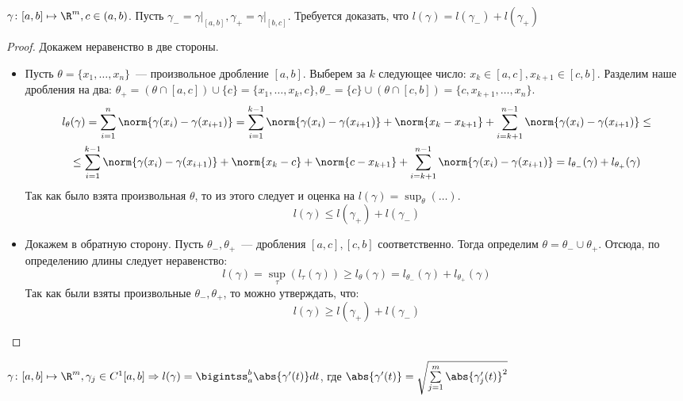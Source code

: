 \begin{theorem}
    $\gamma\colon [a,b]\mapsto\R^m, c\in(a,b)$.
    Пусть $\gamma_{-}=\gamma\big|_{[a,b]}, \gamma_{+} = \gamma\big|_{[b,c]}$.
    Требуется доказать, что $l(\gamma)=l(\gamma_-) + l(\gamma_+)$
\end{theorem}
\begin{proof}
    Докажем неравенство в две стороны.
    \begin{itemize}
        \item
        Пусть $\theta = \{x_1,\dots, x_n\}$~--- произвольное дробление $[a,b]$.
        Выберем за $k$ следующее число: $x_k \in [a,c], x_{k + 1}\in [c,b]$.
        Разделим наше дробления на два:
        $\theta_+ = (\theta \cap [a,c]) \cup \{c\} = \{x_1,\dots,x_k, c\},
        \theta_- = \{c\} \cup (\theta \cap [c, b]) = \{c, x_{k+1},\dots, x_n\}$.
        \[
            \begin{gathered}
                l_{\theta}(\gamma) =
                \sum\limits_{i=1}^{n}\norm{\gamma(x_i) - \gamma(x_{i + 1})}=
                \sum\limits_{i=1}^{k-1}\norm{\gamma(x_i) - \gamma(x_{i + 1})} + \norm{x_k - x_{k+1}} +
                \sum\limits_{i=k+1}^{n-1}\norm{\gamma(x_i) - \gamma(x_{i + 1})}\le\\
                \le\sum\limits_{i=1}^{k-1}\norm{\gamma(x_i) - \gamma(x_{i + 1})}
                + \norm{x_k - c} + \norm{c - x_{k + 1}} +
                \sum\limits_{i=k+1}^{n-1}\norm{\gamma(x_i) - \gamma(x_{i + 1})}=
                l_{\theta_-}(\gamma) + l_{\theta_+}(\gamma)
            \end{gathered}
        \] 
        Так как было взята произвольная $\theta$, то из этого следует и оценка на $l(\gamma) = \sup_\theta(\dots)$.
        \[
            l(\gamma) \le l(\gamma_+) + l(\gamma_-)
        \] 
        \item
        Докажем в обратную сторону.
        Пусть $\theta_-, \theta_+$~--- дробления $[a,c], [c, b]$ соответственно.
        Тогда определим $\theta = \theta_- \cup \theta_+$. Отсюда, по определению длины следует неравенство:
         \[
             l(\gamma) = \sup_{\tau}(l_{\tau}(\gamma)) \ge l_{\theta}(\gamma) = l_{\theta_-}(\gamma) + l_{\theta_+}(\gamma)
        \] 
        Так как были взяты произвольные $\theta_-, \theta_+$, то можно утверждать, что:
         \[
             l(\gamma) \ge l(\gamma_+) + l(\gamma_-)
        \] 
    \end{itemize}
\end{proof}
\begin{theorem}
    $\gamma\colon[a,b]\mapsto\R^m, \gamma_j\in C^1[a,b] \Rightarrow 
    l(\gamma)=\bigintss_{a}^{b}\abs{\gamma'(t)}dt$, где
    $\abs{\gamma'(t)} = \sqrt{\sum\limits_{j=1}^{m}{\abs{\gamma'_j(t)}}^2}$
\end{theorem}
